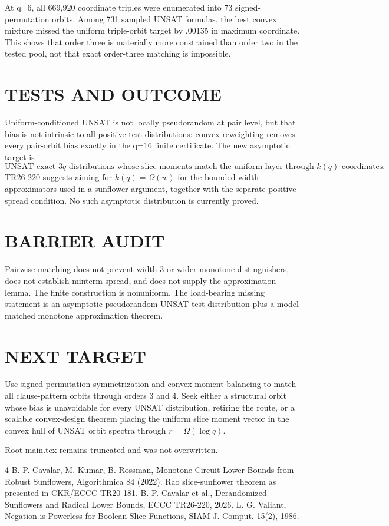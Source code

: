 \documentclass[11pt]{article}
\begin{document}
At q=6, all 669,920 coordinate triples were enumerated into 73 signed-permutation orbits. Among 731 sampled UNSAT formulas, the best convex mixture missed the uniform triple-orbit target by .00135 in maximum coordinate. This shows that order three is materially more constrained than order two in the tested pool, not that exact order-three matching is impossible.

\section{TESTS AND OUTCOME}
Uniform-conditioned UNSAT is not locally pseudorandom at pair level, but that bias is not intrinsic to all positive test distributions: convex reweighting removes every pair-orbit bias exactly in the q=16 finite certificate. The new asymptotic target is
\[\boxed{\text{UNSAT exact-}3q\text{ distributions whose slice moments match the uniform layer through }k(q)\text{ coordinates}.}\]
TR26-220 suggests aiming for $k(q)=\Omega(w)$ for the bounded-width approximators used in a sunflower argument, together with the separate positive-spread condition. No such asymptotic distribution is currently proved.

\section{BARRIER AUDIT}
Pairwise matching does not prevent width-3 or wider monotone distinguishers, does not establish minterm spread, and does not supply the approximation lemma. The finite construction is nonuniform. The load-bearing missing statement is an asymptotic pseudorandom UNSAT test distribution plus a model-matched monotone approximation theorem.

\section{NEXT TARGET}
Use signed-permutation symmetrization and convex moment balancing to match all clause-pattern orbits through orders 3 and 4. Seek either a structural orbit whose bias is unavoidable for every UNSAT distribution, retiring the route, or a scalable convex-design theorem placing the uniform slice moment vector in the convex hull of UNSAT orbit spectra through $r=\Omega(\log q)$.

Root main.tex remains truncated and was not overwritten.
\begin{thebibliography}{4}
 B. P. Cavalar, M. Kumar, B. Rossman, Monotone Circuit Lower Bounds from Robust Sunflowers, Algorithmica 84 (2022).
 Rao slice-sunflower theorem as presented in CKR/ECCC TR20-181.
 B. P. Cavalar et al., Derandomized Sunflowers and Radical Lower Bounds, ECCC TR26-220, 2026.
 L. G. Valiant, Negation is Powerless for Boolean Slice Functions, SIAM J. Comput. 15(2), 1986.
\end{thebibliography}
\end{document}
